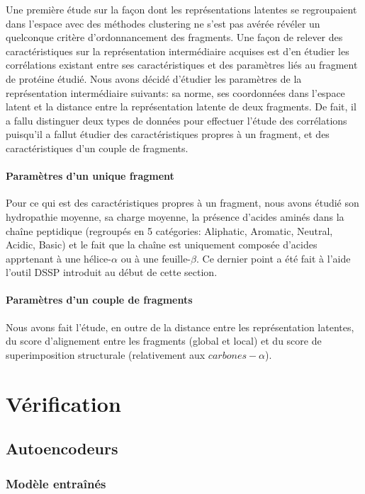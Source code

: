 \documentclass[a4paper, 11pt, onecolumn]{article}
\begin{document}
Une première étude sur la façon dont les représentations latentes se
regroupaient dans l'espace avec des méthodes clustering ne s'est pas avérée
révéler un quelconque critère d'ordonnancement des fragments. 
Une façon de relever des caractéristiques sur la représentation
intermédiaire acquises est d'en étudier les corrélations existant entre ses
caractéristiques et des paramètres liés au fragment de protéine étudié. Nous
avons décidé d'étudier les paramètres de la représentation intermédiaire
suivants: sa norme, ses coordonnées dans l'espace latent et la distance entre la
représentation latente de deux fragments. De fait, il a fallu distinguer deux
types de données pour effectuer l'étude des corrélations puisqu'il a fallut
étudier des caractéristiques propres à un fragment, et des caractéristiques
d'un couple de fragments.

\paragraph{Paramètres d'un unique fragment}

Pour ce qui est des caractéristiques propres à un fragment, nous avons étudié
son hydropathie moyenne, sa charge moyenne, la présence d'acides aminés dans la
chaîne peptidique (regroupés en 5 catégories: Aliphatic, Aromatic, Neutral,
Acidic, Basic) et le fait que la chaîne est uniquement composée d'acides apprtenant à
une hélice-$\alpha$ ou à une feuille-$\beta$. Ce dernier point a été fait à
l'aide l'outil DSSP introduit au début de cette section.

\paragraph{Paramètres d'un couple de fragments}

Nous avons fait l'étude, en outre de la distance entre les représentation
latentes, du score d'alignement entre les fragments (global et local) et du score de superimposition structurale (relativement
aux $carbones-\alpha$).

\section{Vérification}

\subsection{Autoencodeurs}

\subsubsection{Modèle entraînés}
\end{document}
